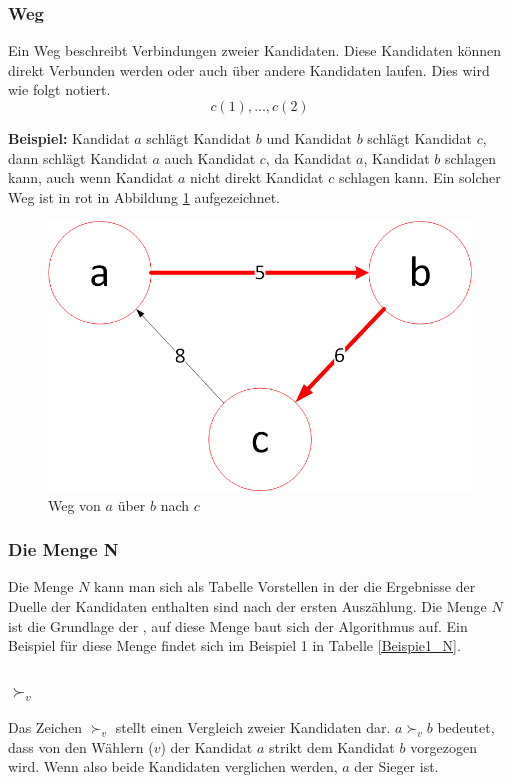 \newpage
\subsubsection{Weg}
\label{weg}
Ein Weg beschreibt Verbindungen zweier Kandidaten. Diese Kandidaten können direkt Verbunden werden oder auch über andere Kandidaten laufen. Dies wird wie folgt notiert.
\[
c(1),...,c(2)
\]

\textbf{Beispiel:} Kandidat $a$ schlägt Kandidat $b$ und Kandidat $b$ schlägt Kandidat $c$, dann schlägt Kandidat $a$ auch Kandidat $c$, da Kandidat $a$, Kandidat $b$ schlagen kann, auch wenn Kandidat $a$ nicht direkt Kandidat $c$ schlagen kann. Ein solcher Weg ist in rot in Abbildung \ref{fig:weg} aufgezeichnet. 

\begin{figure}[!h]
\centering
\includegraphics[scale=0.5]{Bilder/Weg.png}
\caption{Weg von $a$ über $b$ nach $c$}
\label{fig:weg}
\end{figure}

\subsubsection{Die Menge N}
\label{mengeN}
Die Menge $N$ kann man sich als Tabelle Vorstellen in der die Ergebnisse der Duelle der Kandidaten enthalten sind nach der ersten Auszählung. Die Menge $N$ ist die Grundlage der \schulze , auf diese Menge baut sich der Algorithmus auf. Ein Beispiel für diese Menge findet sich im Beispiel 1 in Tabelle \ref{Beispie1_N}.

\subsubsection{$\succ_{v}$}
\label{vv}
Das Zeichen $\succ_{v}$ stellt einen Vergleich zweier Kandidaten dar. $a \succ_{v}{ } b$ bedeutet, dass von den Wählern ($v$) der Kandidat $a$ strikt dem Kandidat $b$ vorgezogen wird. Wenn also beide Kandidaten verglichen werden, $a$ der Sieger ist.

